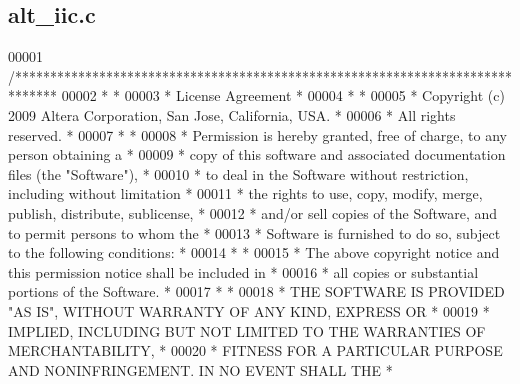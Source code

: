 \subsection{alt\+\_\+iic.\+c}
\label{alt__iic_8c_source}

\begin{DoxyCode}
00001 \textcolor{comment}{/******************************************************************************}
00002 \textcolor{comment}{*                                                                             *}
00003 \textcolor{comment}{* License Agreement                                                           *}
00004 \textcolor{comment}{*                                                                             *}
00005 \textcolor{comment}{* Copyright (c) 2009 Altera Corporation, San Jose, California, USA.           *}
00006 \textcolor{comment}{* All rights reserved.                                                        *}
00007 \textcolor{comment}{*                                                                             *}
00008 \textcolor{comment}{* Permission is hereby granted, free of charge, to any person obtaining a     *}
00009 \textcolor{comment}{* copy of this software and associated documentation files (the "Software"),  *}
00010 \textcolor{comment}{* to deal in the Software without restriction, including without limitation   *}
00011 \textcolor{comment}{* the rights to use, copy, modify, merge, publish, distribute, sublicense,    *}
00012 \textcolor{comment}{* and/or sell copies of the Software, and to permit persons to whom the       *}
00013 \textcolor{comment}{* Software is furnished to do so, subject to the following conditions:        *}
00014 \textcolor{comment}{*                                                                             *}
00015 \textcolor{comment}{* The above copyright notice and this permission notice shall be included in  *}
00016 \textcolor{comment}{* all copies or substantial portions of the Software.                         *}
00017 \textcolor{comment}{*                                                                             *}
00018 \textcolor{comment}{* THE SOFTWARE IS PROVIDED "AS IS", WITHOUT WARRANTY OF ANY KIND, EXPRESS OR  *}
00019 \textcolor{comment}{* IMPLIED, INCLUDING BUT NOT LIMITED TO THE WARRANTIES OF MERCHANTABILITY,    *}
00020 \textcolor{comment}{* FITNESS FOR A PARTICULAR PURPOSE AND NONINFRINGEMENT. IN NO EVENT SHALL THE *}

\end{DoxyCode}
